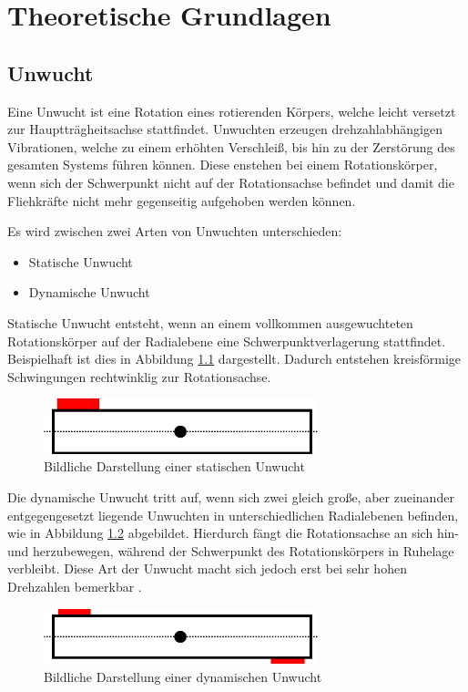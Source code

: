 
\chapter{Theoretische Grundlagen}

\section{Unwucht}
Eine Unwucht ist eine Rotation eines rotierenden Körpers, welche leicht versetzt zur Hauptträgheitsachse stattfindet.
Unwuchten erzeugen drehzahlabhängigen Vibrationen, welche zu einem erhöhten Verschleiß, bis hin zu der Zerstörung des gesamten Systems führen können.
Diese enstehen bei einem Rotationskörper, wenn sich der Schwerpunkt nicht auf der Rotationsachse befindet und damit die Fliehkräfte nicht mehr gegenseitig aufgehoben werden können. \cite{unwucht_wiki:2011}

Es wird zwischen zwei Arten von Unwuchten unterschieden:
\begin{itemize}
    \item Statische Unwucht
    \item Dynamische Unwucht
\end{itemize}

Statische Unwucht entsteht, wenn an einem vollkommen ausgewuchteten Rotationskörper auf der Radialebene eine Schwerpunktverlagerung stattfindet. Beispielhaft ist dies in Abbildung \ref{fig:static_imbalance} dargestellt.
Dadurch entstehen kreisförmige Schwingungen rechtwinklig zur Rotationsachse.
\begin{figure}[H]
    \centering
    \includegraphics[width=8cm]{images/chapter/02/static_imbalance.png}
    \caption{Bildliche Darstellung einer statischen Unwucht}
    \label{fig:static_imbalance}
\end{figure}

Die dynamische Unwucht tritt auf, wenn sich zwei gleich große, aber zueinander entgegengesetzt liegende Unwuchten in unterschiedlichen Radialebenen befinden, wie in Abbildung \ref{fig:dynamic_imbalance} abgebildet.
Hierdurch fängt die Rotationsachse an sich hin- und herzubewegen, während der Schwerpunkt des Rotationskörpers in Ruhelage verbleibt.
Diese Art der Unwucht macht sich jedoch erst bei sehr hohen Drehzahlen bemerkbar \cite[S. 8]{vibromatrix:2007}.
\begin{figure}[H]
    \centering
    \includegraphics[width=8cm]{images/chapter/02/dynamic_imbalance.png}
    \caption{Bildliche Darstellung einer dynamischen Unwucht}
    \label{fig:dynamic_imbalance}
\end{figure}

